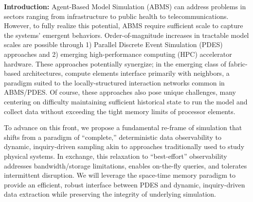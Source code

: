 \noindent\textbf{Introduction:}
Agent-Based Model Simulation (ABMS) can address problems in sectors ranging from infrastructure to public health to
telecommunications.
However, to fully realize this potential, ABMS require sufficient scale to capture the systems' emergent behaviors.
Order-of-magnitude increases in tractable model scales are possible through 1) Parallel Discrete Event Simulation (PDES) approaches and 2) emerging high-performance computing (HPC) accelerator hardware.
These approaches potentially synergize; in the emerging class of fabric-based architectures, compute elements interface primarily with neighbors, a paradigm suited to the locally-structured interaction networks common in ABMS/PDES.
Of course, these approaches also pose unique challenges, many centering on difficulty maintaining sufficient historical state to run the model and collect data without exceeding the tight memory limits of processor elements.

To advance on this front, we propose a fundamental re-frame of simulation that shifts from a paradigm of ``complete,'' deterministic data observability to dynamic, inquiry-driven sampling akin to approaches traditionally used to study physical systems.
In exchange, this relaxation to ``best-effort'' observability addresses bandwidth/storage limitations, enables on-the-fly queries, and tolerates intermittent disruption.
We will leverage the space-time memory paradigm to provide an efficient, robust interface between PDES and dynamic, inquiry-driven data extraction while preserving the integrity of underlying simulation.

